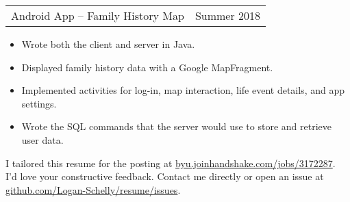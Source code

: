 \documentclass{article}
\newenvironment{compactItemize}{
  \begin{itemize}[itemsep=0ex, parsep=0ex, partopsep=0ex, topsep= -7pt]
}{
  \end{itemize}
}
\newcommand{\project}[2]{
  \begingroup
  \setlength{\tabcolsep}{0ex}
  \begin{tabularx}{\linewidth}{X r}
    #1 & %
    #2\\ %
  \end{tabularx}%
  \endgroup%
}
\begin{document}
\project{Android App -- Family History Map}{Summer 2018}
\begin{compactItemize}
  \item Wrote both the client and server in Java.
  \item Displayed family history data with a Google MapFragment.
  \item Implemented activities for log-in, map interaction, life event details, and app settings.
  \item Wrote the SQL commands that the server would use to store and retrieve user data.
\end{compactItemize}


\vfill
\begin{center}
  I tailored this resume for the posting at \href{https://byu.joinhandshake.com/jobs/3172287}{byu.joinhandshake.com/jobs/3172287}.\\
  I'd love your constructive feedback.  Contact me directly or open an issue at \href{https://github.com/Logan-Schelly/resume/issues}{github.com/Logan-Schelly/resume/issues}.
\end{center}
\end{document}
